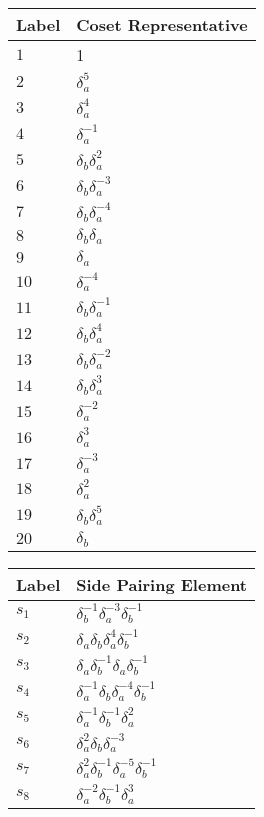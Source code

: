 \documentclass{article}
\begin{document}
\begin{center}
\begin{tabular}{ll}
\toprule
Label & Coset Representative\\
\midrule
$1$ & 1 \\
$2$ & $\delta_a^{5}$ \\
$3$ & $\delta_a^{4}$ \\
$4$ & $\delta_a^{-1}$ \\
$5$ & $\delta_b^{}\delta_a^{2}$ \\
$6$ & $\delta_b^{}\delta_a^{-3}$ \\
$7$ & $\delta_b^{}\delta_a^{-4}$ \\
$8$ & $\delta_b^{}\delta_a^{}$ \\
$9$ & $\delta_a^{}$ \\
$10$ & $\delta_a^{-4}$ \\
$11$ & $\delta_b^{}\delta_a^{-1}$ \\
$12$ & $\delta_b^{}\delta_a^{4}$ \\
$13$ & $\delta_b^{}\delta_a^{-2}$ \\
$14$ & $\delta_b^{}\delta_a^{3}$ \\
$15$ & $\delta_a^{-2}$ \\
$16$ & $\delta_a^{3}$ \\
$17$ & $\delta_a^{-3}$ \\
$18$ & $\delta_a^{2}$ \\
$19$ & $\delta_b^{}\delta_a^{5}$ \\
$20$ & $\delta_b^{}$ \\
\bottomrule
\end{tabular}
\hfill
\begin{tabular}{ll}
\toprule
Label & Side Pairing Element\\
\midrule
$s_{1}$ & $\delta_b^{-1}\delta_a^{-3}\delta_b^{-1}$ \\
$s_{2}$ & $\delta_a^{}\delta_b^{}\delta_a^{4}\delta_b^{-1}$ \\
$s_{3}$ & $\delta_a^{}\delta_b^{-1}\delta_a^{}\delta_b^{-1}$ \\
$s_{4}$ & $\delta_a^{-1}\delta_b^{}\delta_a^{-4}\delta_b^{-1}$ \\
$s_{5}$ & $\delta_a^{-1}\delta_b^{-1}\delta_a^{2}$ \\
$s_{6}$ & $\delta_a^{2}\delta_b^{}\delta_a^{-3}$ \\
$s_{7}$ & $\delta_a^{2}\delta_b^{-1}\delta_a^{-5}\delta_b^{-1}$ \\
$s_{8}$ & $\delta_a^{-2}\delta_b^{-1}\delta_a^{3}$ \\

\end{tabular}
\end{center}
\end{document}
